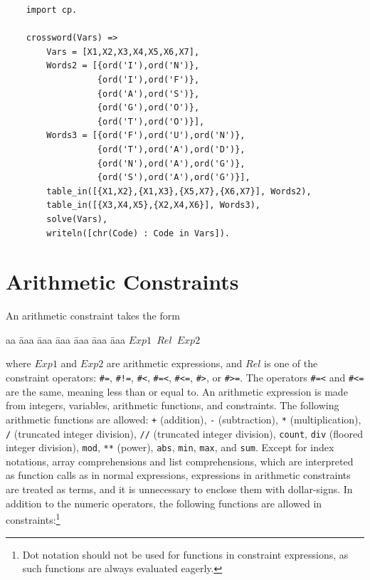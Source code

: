\begin{verbatim}
    import cp.

    crossword(Vars) =>
        Vars = [X1,X2,X3,X4,X5,X6,X7], 
        Words2 = [{ord('I'),ord('N')},
                  {ord('I'),ord('F')},
                  {ord('A'),ord('S')},
                  {ord('G'),ord('O')},
                  {ord('T'),ord('O')}],
        Words3 = [{ord('F'),ord('U'),ord('N')},
                  {ord('T'),ord('A'),ord('D')},
                  {ord('N'),ord('A'),ord('G')},
                  {ord('S'),ord('A'),ord('G')}],
        table_in([{X1,X2},{X1,X3},{X5,X7},{X6,X7}], Words2),
        table_in([{X3,X4,X5},{X2,X4,X6}], Words3),
        solve(Vars),
        writeln([chr(Code) : Code in Vars]).
\end{verbatim}

\section{Arithmetic Constraints}
An arithmetic constraint takes the form
\begin{tabbing}
aa \= aaa \= aaa \= aaa \= aaa \= aaa \= aaa \kill
\> \texttt{$Exp1$ $Rel$ $Exp2$} 
\end{tabbing}
where $Exp1$ and $Exp2$ are arithmetic expressions, and $Rel$ is one of the constraint operators:  \verb+#=+, \verb+#!=+, \verb+#<+, \verb+#=<+, \verb+#<=+, \verb+#>+, or \verb+#>=+. The operators \verb+#=<+ and \verb+#<=+ are the same, meaning less than or equal to. An arithmetic expression is made from integers, variables, arithmetic functions, and constraints. The following arithmetic functions are allowed: \texttt{+} (addition), \texttt{-} (subtraction), \texttt{*} (multiplication), \texttt{/} (truncated integer division), \texttt{//} (truncated integer division), \texttt{count}, \texttt{div} (floored integer division), \texttt{mod}, \texttt{**} (power), \texttt{abs}, \texttt{min}, \texttt{max}, and \texttt{sum}.  Except for index notations, array comprehensions and list comprehensions, which are interpreted as function calls as in normal expressions, expressions in arithmetic constraints are treated as terms, and it is unnecessary to enclose them with dollar-signs. In addition to the numeric operators, the following functions are allowed in constraints:\footnote{Dot notation should not be used for functions in constraint expressions, as such functions are always evaluated eagerly.}
